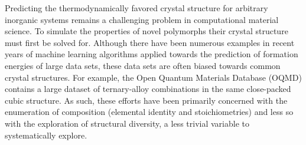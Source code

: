 %



%
Predicting the thermodynamically favored crystal structure for arbitrary inorganic systems remains a challenging problem in computational material science.
\cite{Woodley2008,Graser2018}
%
To simulate the properties of novel polymorphs their crystal structure must first be solved for.
%
Although there have been numerous examples in recent years of machine learning algorithms applied towards the prediction of formation energies of large  data sets,
these data sets are often biased towards common crystal structures.
%
For example, the Open Quantum Materials Database (OQMD) contains a large dataset of ternary-alloy combinations in the same close-packed cubic structure.
\cite{Kirklin2015}
%
As such, these efforts have been primarily concerned with the enumeration of composition (elemental identity and stoichiometries) and less so with the exploration of structural diversity, a less trivial variable to systematically explore.



